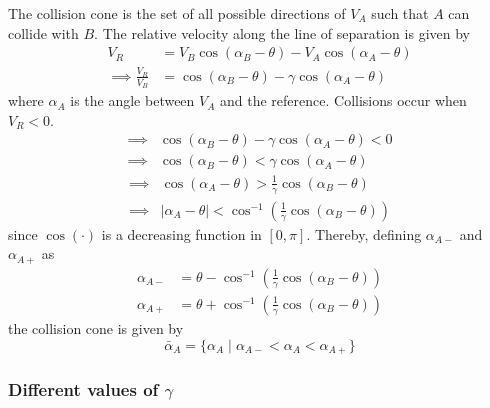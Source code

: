 The collision cone is the set of all possible directions of \( V_A \) such that \( A \) can collide with \( B \).
The relative velocity along the line of separation is given by
\begin{align*}
      V_{R}
       & =
      V_B \cos (\alpha_B - \theta) - V_A \cos (\alpha_A - \theta)
      \\
      \implies
      \frac{V_R}{V_B}
       & =
      \cos (\alpha_B - \theta) - \gamma \cos (\alpha_A - \theta)
\end{align*}
where \( \alpha_A \) is the angle between \( V_A \) and the reference.
Collisions occur when \( V_R < 0 \).
\begin{align*}
      \implies &
      \cos (\alpha_B - \theta) - \gamma \cos (\alpha_A - \theta) < 0
      \\ \implies &
      \cos (\alpha_B - \theta) < \gamma \cos (\alpha_A - \theta)
\end{align*}
\begin{align*}
      \implies &
      \cos (\alpha_A - \theta) > \frac{1}{\gamma} \cos (\alpha_B - \theta)
      \\ \implies &
      \vert \alpha_A - \theta \vert < \cos^{-1} \left( \frac{1}{\gamma} \cos (\alpha_B - \theta) \right)
\end{align*}
since \( \cos(\cdot) \) is a decreasing function in \( [0, \pi] \). Thereby, defining \( \alpha_{A -} \) and \( \alpha_{A +} \) as
\begin{equation*}
      \boxed{
            \begin{aligned}
                  \alpha_{A -}
                   & =
                  \theta - \cos^{-1} \left( \frac{1}{\gamma} \cos (\alpha_B - \theta) \right)
                  \\
                  \alpha_{A +}
                   & =
                  \theta + \cos^{-1} \left( \frac{1}{\gamma} \cos (\alpha_B - \theta) \right)
            \end{aligned}
      }
\end{equation*}
the collision cone is given by
\begin{equation*}
      \boxed{
            \bar \alpha_A = \{ \alpha_A \mid \alpha_{A -} < \alpha_A < \alpha_{A +} \}
      }
\end{equation*}

\subsubsection*{Different values of \( \gamma \)}

